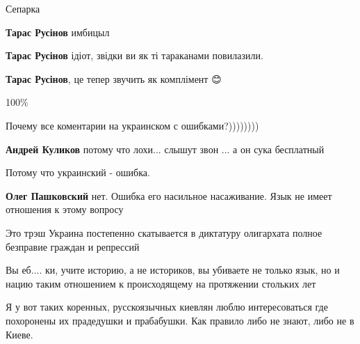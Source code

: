 \begin{itemize}
Сепарка

\begin{itemize}
\textbf{Тарас Русінов} имбицыл🤷

\textbf{Тарас Русінов} ідіот, звідки ви як ті тараканами повилазили.

\textbf{Тарас Русінов}, це тепер звучить як комплімент 😊
\end{itemize}

100\%

\begin{itemize}
Почему все коментарии на украинском с ошибками?))))))))

\textbf{Андрей Куликов} потому что лохи... слышут звон ... а он сука бесплатный

Потому что украинский - ошибка.

\textbf{Олег Пашковский} нет. Ошибка его насильное насаживание. Язык не имеет отношения к этому вопросу
\end{itemize}

Это трэш Украина постепенно скатывается в диктатуру олигархата полное безправие граждан и репрессий


Вы еб.... ки, учите историю, а не историков, вы убиваете не только язык, но и
нацию таким отношением к происходящему на протяжении стольких лет



Я у вот таких коренных, русскоязычных киевлян люблю интересоваться где
похоронены их прадедушки и прабабушки. Как правило либо не знают, либо не в
Киеве.


\end{itemize}
